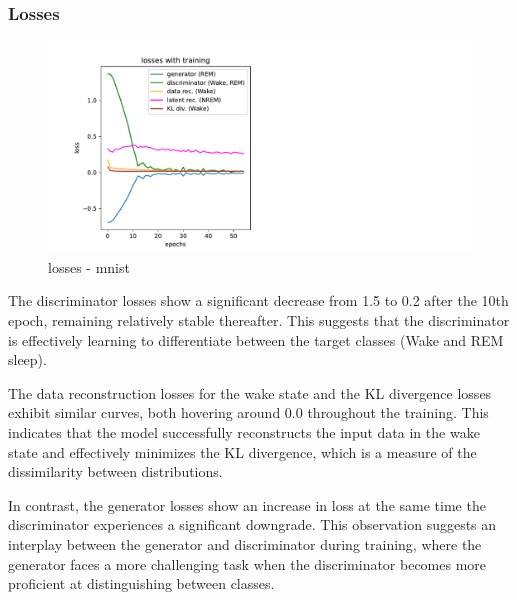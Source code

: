 \documentclass{midl} %
\begin{document}
\subsubsection{Losses}
\begin{figure}[H]
  \centering
  \includegraphics[width=1.2\textwidth]{losses_mnist.pdf}
  \caption{losses - mnist}
  \label{fig: losses - mnist}
\end{figure}
The discriminator losses show a significant decrease from 1.5 to 0.2 after the 10th epoch, remaining relatively stable thereafter. This suggests that the discriminator is effectively learning to differentiate between the target classes (Wake and REM sleep).

The data reconstruction losses for the wake state and the KL divergence losses exhibit similar curves, both hovering around 0.0 throughout the training. This indicates that the model successfully reconstructs the input data in the wake state and effectively minimizes the KL divergence, which is a measure of the dissimilarity between distributions.

In contrast, the generator losses show an increase in loss at the same time the discriminator experiences a significant downgrade. This observation suggests an interplay between the generator and discriminator during training, where the generator faces a more challenging task when the discriminator becomes more proficient at distinguishing between classes.
\end{document}
